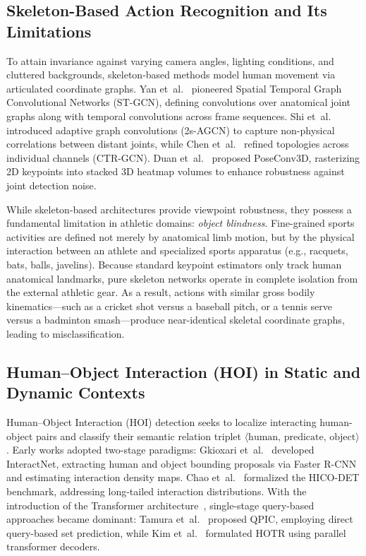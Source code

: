 \subsection{Skeleton-Based Action Recognition and Its Limitations}
To attain invariance against varying camera angles, lighting conditions, and cluttered backgrounds, skeleton-based methods model human movement via articulated coordinate graphs. Yan et~al.~\cite{yan2018spatial} pioneered Spatial Temporal Graph Convolutional Networks (ST-GCN), defining convolutions over anatomical joint graphs along with temporal convolutions across frame sequences. Shi et~al.~\cite{shi2019two} introduced adaptive graph convolutions (2s-AGCN) to capture non-physical correlations between distant joints, while Chen et~al.~\cite{chen2021channel} refined topologies across individual channels (CTR-GCN). Duan et~al.~\cite{duan2022pyskl} proposed PoseConv3D, rasterizing 2D keypoints into stacked 3D heatmap volumes to enhance robustness against joint detection noise.

While skeleton-based architectures provide viewpoint robustness, they possess a fundamental limitation in athletic domains: \textit{object blindness}. Fine-grained sports activities are defined not merely by anatomical limb motion, but by the physical interaction between an athlete and specialized sports apparatus (e.g., racquets, bats, balls, javelins). Because standard keypoint estimators only track human anatomical landmarks, pure skeleton networks operate in complete isolation from the external athletic gear. As a result, actions with similar gross bodily kinematics---such as a cricket shot versus a baseball pitch, or a tennis serve versus a badminton smash---produce near-identical skeletal coordinate graphs, leading to misclassification.

\subsection{Human--Object Interaction (HOI) in Static and Dynamic Contexts}
Human--Object Interaction (HOI) detection seeks to localize interacting human-object pairs and classify their semantic relation triplet $\langle \text{human, predicate, object} \rangle$. Early works adopted two-stage paradigms: Gkioxari et~al.~\cite{gkioxari2018detecting} developed InteractNet, extracting human and object bounding proposals via Faster R-CNN~\cite{ren2015faster} and estimating interaction density maps. Chao et~al.~\cite{chao2018rethinking} formalized the HICO-DET benchmark, addressing long-tailed interaction distributions. With the introduction of the Transformer architecture~\cite{vaswani2017attention}, single-stage query-based approaches became dominant: Tamura et~al.~\cite{tamura2021qpic} proposed QPIC, employing direct query-based set prediction, while Kim et~al.~\cite{kim2021hotr} formulated HOTR using parallel transformer decoders.

